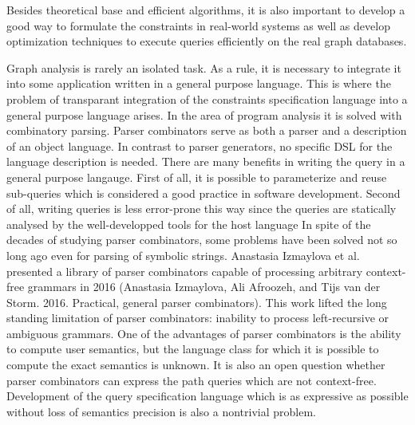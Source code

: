 \documentclass[12pt]{article}  %
\theoremstyle{remark}
\begin{document}
Besides theoretical base and efficient algorithms, it is also important to develop a good way to formulate the constraints in real-world systems as well as develop optimization techniques to execute queries efficiently on the real graph databases.

Graph analysis is rarely an isolated task.
As a rule, it is necessary to integrate it into some application written in a general purpose language.
This is where the problem of transparant integration of the constraints specification language into a general purpose language arises.
In the area of program analysis it is solved with combinatory parsing.
Parser combinators serve as both a parser and a description of an object language.
In contrast to parser generators, no specific DSL for the language description is needed.
There are many benefits in writing the query in a general purpose langauge.
First of all, it is possible to parameterize and reuse sub-queries which is considered a good practice in software development.
Second of all, writing queries is less error-prone this way since the queries are statically analysed by the well-developped tools for the host language
In spite of the decades of studying parser combinators, some problems have been solved not so long ago even for parsing of symbolic strings.
Anastasia Izmaylova et al. presented a library of parser combinators capable of processing arbitrary context-free grammars in 2016 (Anastasia Izmaylova, Ali Afroozeh, and Tijs van der Storm. 2016. Practical, general parser combinators).
This work lifted the long standing limitation of parser combinators: inability to process left-recursive or ambiguous grammars.
One of the advantages of parser combinators is the ability to compute user semantics, but the language class for which it is possible to compute the exact semantics is unknown.
It is also an open question whether parser combinators can express the path queries which are not context-free.
Development of the query specification language which is as expressive as possible without loss of semantics precision is also a nontrivial problem.
\end{document}
